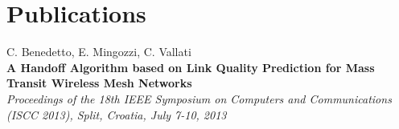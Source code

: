 \label{sec:references}

\section{Publications}
C. Benedetto, E. Mingozzi, C. Vallati\\
\textbf{A Handoff Algorithm based on Link Quality Prediction for Mass Transit Wireless Mesh Networks}\\
\emph{Proceedings of the 18th IEEE Symposium on Computers and Communications (ISCC 2013), Split, Croatia, July 7-10, 2013}
\\

\begin{rubrique}{
\iftoggle{ES}{Referencias}{}
\iftoggle{EN}{References}{}
}

\begin{sousrubrique}
\iftoggle{ES}{\Titre{Title}}{}
\iftoggle{ES}{\Lieu{StudyCenter}}{}
\iftoggle{ES}{\Duree{Duration}}{}
\iftoggle{ES}{\Descr{Espacialización}}{}
\iftoggle{ES}{\Apport{Asignatura1}}{}
\iftoggle{ES}{\Apport{Asignatura1}}{}
\iftoggle{ES}{\Apport{Asignatura1}}{}
\iftoggle{ES}{\Apport{Asignatura1}}{}
\end{sousrubrique}

\end{rubrique}